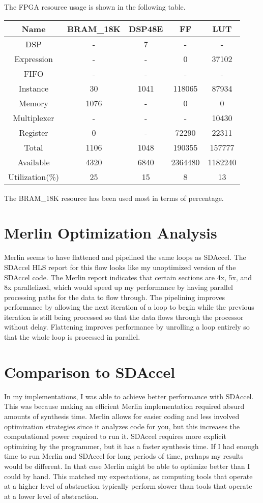 \documentclass[12pt]{article}
\begin{document}
The FPGA resource usage is shown in the following table.
\begin{center}
    \begin{tabular}{c|cccc}
        Name & BRAM\_18K & DSP48E & FF & LUT\\
        \hline
        DSP & - & 7 & - & -\\
        Expression & - & - & 0 & 37102\\
        FIFO & - & - & - & -\\
        Instance & 30 & 1041 & 118065 & 87934\\
        Memory & 1076 & - & 0 & 0\\
        Multiplexer & - & - & - & 10430\\
        Register & 0 & - & 72290 & 22311\\
        \hline
        Total & 1106 & 1048 & 190355 & 157777\\
        Available & 4320 & 6840 & 2364480 & 1182240\\
        \hline
        Utilization(\%) & 25 & 15 & 8 & 13
    \end{tabular}
\end{center}
The BRAM\_18K resource has been used most in terms of percentage.

\section{Merlin Optimization Analysis}

Merlin seems to have flattened and pipelined the same loops as SDAccel. The SDAccel HLS
report for this flow looks like my unoptimized version of the SDAccel code. The Merlin
report indicates that certain sections are 4x, 5x, and 8x parallelized, which would speed
up my performance by having parallel processing paths for the data to flow through. The
pipelining improves performance by allowing the next iteration of a loop to begin while
the previous iteration is still being processed so that the data flows through the processor
without delay. Flattening improves performance by unrolling a loop entirely so that the whole
loop is processed in parallel.

\section{Comparison to SDAccel}

In my implementations, I was able to achieve better performance with SDAccel. This was because
making an efficient Merlin implementation required absurd amounts of synthesis time. Merlin
allows for easier coding and less involved optimization strategies since it analyzes
code for you, but this increases the computational power required to run it. SDAccel
requires more explicit optimizing by the programmer, but it has a faster synthesis time.
If I had enough time to run Merlin and SDAccel for long periods of time, perhaps my results
would be different. In that case Merlin might be able to optimize better than I could by hand.
This matched my expectations, as computing tools that operate at a higher level of abstraction
typically perform slower than tools that operate at a lower level of abstraction.
\end{document}
